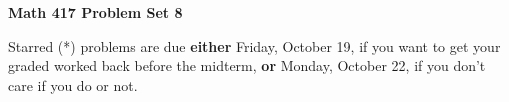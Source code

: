 \documentclass[12pt]{article}
\begin{document}
\def\ctln{\centerline}
\def\msk{\medskip}
\def\bsk{\bigskip}
\def\ssk{\smallskip}
\def\hsk{\hskip.3in}
\def\ra{\rightarrow}
\def\ubr{\underbar}

\def\mt{{\mathcal T}}
\def\mb{{\mathcal B}}
\def\ms{{\mathcal S}}
\def\mu{{\mathcal U}}
\def\mv{{\mathcal V}}

\def\bbr{{\mathbb R}}
\def\bbz{{\mathbb Z}}
\def\spc{$~$\hskip.15in$~$}

\def\sset{\subseteq}
\def\del{\partial}
\def\lra{$\Leftrightarrow$}
\def\bra{$\Rightarrow$}




\ctln{\bf Math 417 Problem Set 8}

\msk

Starred (*) problems are due {\bf either} Friday, October 19, if you want to get your graded 
worked back before the midterm, {\bf or} Monday, October 22, if you don't care if you do or not.
\end{document}
